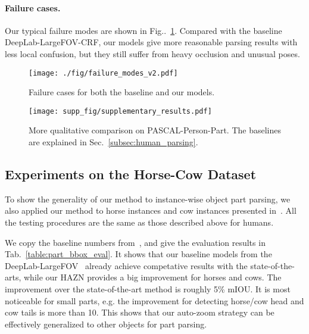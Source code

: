\documentclass[runningheads]{llncs}
\makeatletter
\newcommand{\figref}[1]{Fig\onedot~\ref{#1}}
\DeclareRobustCommand\onedot{\futurelet\@let@token\@onedot}
\def\@onedot{\ifx\@let@token.\else.\null\fi\xspace}
\makeatother
\begin{document}
\paragraph{Failure cases.} Our typical failure modes are shown in \figref{fig:seg_image_fail}. Compared with the baseline DeepLab-LargeFOV-CRF, our models give more reasonable parsing results with less local confusion, but they still suffer from heavy occlusion and unusual poses.

\begin{figure}[!t]
\centering
\texttt{[image: ./fig/failure\_modes\_v2.pdf]}
\caption{Failure cases for both the baseline and our models.}
\vspace{-1.2\baselineskip}
\label{fig:seg_image_fail}
\end{figure}


\begin{figure}[!htbp]
\centering
\hspace*{-0.4cm}
\texttt{[image: supp\_fig/supplementary\_results.pdf]}
\caption{More qualitative comparison on PASCAL-Person-Part. The baselines are explained in Sec.~\ref{subsec:human_parsing}.}
\label{fig:human_res}
\end{figure}




\subsection{Experiments on the Horse-Cow Dataset}
\label{sec:horses}
\vspace{-0.3\baselineskip}
To show the generality of our method to instance-wise object part parsing, we also applied our method to horse instances and cow instances presented in~\cite{wang2014semantic}. All the testing procedures are the same as those described above for humans.
 
We copy the baseline numbers from~\cite{wang2015joint}, and give the evaluation results in Tab.~\ref{table:part_bbox_eval}. It shows that our baseline models from the DeepLab-LargeFOV~\cite{chen2014semantic} already achieve competative results with the state-of-the-arts, while our HAZN provides a big improvement for horses and cows. The improvement over the state-of-the-art method \cite{wang2015joint} is roughly 5\% mIOU. It is most noticeable for small parts, e.g. the improvement for detecting horse/cow head and cow tails is more than 10. This shows that our auto-zoom strategy can be effectively generalized to other objects for part parsing. 
\end{document}
